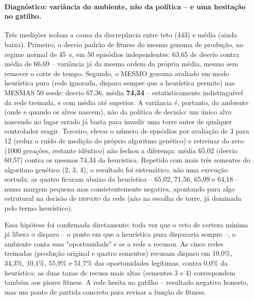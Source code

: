 \documentclass[12pt,a4paper]{article}
\begin{document}
\paragraph{Diagnóstico: variância do ambiente, não da política -- e uma hesitação no gatilho.}
Três medições isolam a causa da discrepância entre teto (443) e média (ainda baixa). Primeiro, o
desvio padrão de fitness do mesmo genoma de produção, no regime normal de 45~s, em 50 episódios
independentes: 63,65 de desvio contra média de 66,69 -- variância já da mesma ordem da própria
média, mesmo sem remover o corte de tempo. Segundo, o MESMO genoma avaliado em modo
heurística pura (rede ignorada, dispara sempre que a heurística permite) nas MESMAS 50
seeds: desvio 67,36, média \textbf{74,34} -- estatisticamente indistinguível da rede treinada, e com
média até superior. A variância é, portanto, do ambiente (onde e quando os alvos nascem), não da
política de decisão: um único alvo nascendo no lugar errado já basta para invadir uma torre antes
de qualquer controlador reagir. Terceiro, elevar o número de episódios por avaliação de 3 para 12 (reduz
o ruído de medição do próprio algoritmo genético) e retreinar do zero (1000 gerações, restante
idêntico) não fechou a diferença: média 65,02 (desvio 60,57) contra os mesmos 74,34 da heurística.
Repetido com mais três sementes do algoritmo genético (2, 3, 4), o resultado foi sistemático, não
uma execução sortuda: as quatro ficaram abaixo da heurística -- 65,02, 71,56, 65,09 e 64,18 -- numa
margem pequena mas consistentemente negativa, apontando para algo estrutural na decisão de
\textsc{disparo} da rede (não na escolha de torre, já dominada pelo termo heurístico).

Essa hipótese foi confirmada diretamente: toda vez que o veto de certeza mínima já libera o disparo
-- o ponto em que a heurística pura dispararia sempre --, o ambiente conta essa "oportunidade" e se
a rede a recusou. As cinco redes treinadas (produção original e quatro sementes) recusam disparo em
10,0\%, 34,3\%, 10,1\%, 55,9\% e 51,7\% das oportunidades legítimas, contra 0,0\% da heurística; as
duas taxas de recusa mais altas (sementes 3 e 4) correspondem também aos piores fitness. A rede
hesita no gatilho -- resultado negativo honesto, mas um ponto de partida concreto para revisar a
função de fitness.
\end{document}
